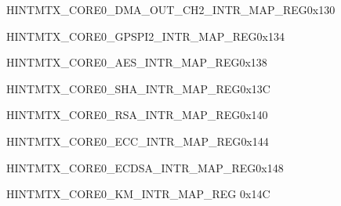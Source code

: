 \begin{register}{H}{INTMTX\_CORE0\_DMA\_OUT\_CH2\_INTR\_MAP\_REG}{0x130}\label{regdesc:INTMTXCORE0DMAOUTCH2INTRMAPREG} \end{register}\vspace{-3em}
\begin{register}{H}{INTMTX\_CORE0\_GPSPI2\_INTR\_MAP\_REG}{0x134}\label{regdesc:INTMTXCORE0GPSPI2INTRMAPREG} \end{register}\vspace{-3em}
\begin{register}{H}{INTMTX\_CORE0\_AES\_INTR\_MAP\_REG}{0x138}\label{regdesc:INTMTXCORE0AESINTRMAPREG} \end{register}\vspace{-3em}
\begin{register}{H}{INTMTX\_CORE0\_SHA\_INTR\_MAP\_REG}{0x13C}\label{regdesc:INTMTXCORE0SHAINTRMAPREG} \end{register}\vspace{-3em}
\begin{register}{H}{INTMTX\_CORE0\_RSA\_INTR\_MAP\_REG}{0x140}\label{regdesc:INTMTXCORE0RSAINTRMAPREG} \end{register}\vspace{-3em}
\begin{register}{H}{INTMTX\_CORE0\_ECC\_INTR\_MAP\_REG}{0x144}\label{regdesc:INTMTXCORE0ECCINTRMAPREG} \end{register}\vspace{-3em}
\begin{register}{H}{INTMTX\_CORE0\_ECDSA\_INTR\_MAP\_REG}{0x148}\label{regdesc:INTMTXCORE0ECDSAINTRMAPREG} \end{register}\vspace{-3em}
\begin{register}{H}{INTMTX\_CORE0\_KM\_INTR\_MAP\_REG}
{0x14C}\label{regdesc:INTMTXCORE0KMINTRMAPREG} \end{register}\vspace{-3em}



